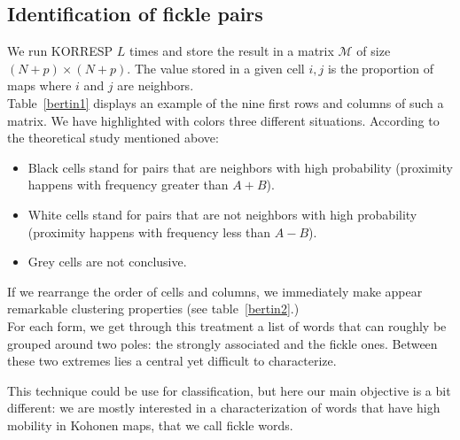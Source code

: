 \documentclass[preprint]{elsarticle}
\begin{document}
\subsection{Identification of fickle pairs}

We run KORRESP $L$ times and store the result in a matrix $\mathcal{M}$ of size $(N+p)\times(N+p)$. The value stored in a given cell $i,j$ is the proportion of maps where $i$ and $j$ are neighbors.\\

Table~\ref{bertin1} displays an example of the nine first rows and columns of such a matrix. We have highlighted with colors three different situations. According to the theoretical study mentioned above:

\begin{itemize}
	\item Black cells stand for pairs that are neighbors with high probability (proximity happens with frequency greater than $A+B$).
	\item White cells stand for pairs that are not neighbors with high probability (proximity happens with frequency less than $A-B$).
	\item Grey cells are not conclusive.
\end{itemize}

If we rearrange the order of cells and columns, we immediately make appear remarkable clustering properties (see table~\ref{bertin2}.)\\

For each form, we get through this treatment a list of words that can roughly be grouped around two poles: the strongly associated and the fickle ones. Between these two extremes lies a central yet difficult to characterize.

This technique could be use for classification, but here our main objective is a bit different: we are mostly interested in a characterization of words that have high mobility in Kohonen maps, that we call fickle words.

\label{m1}
\end{document}
